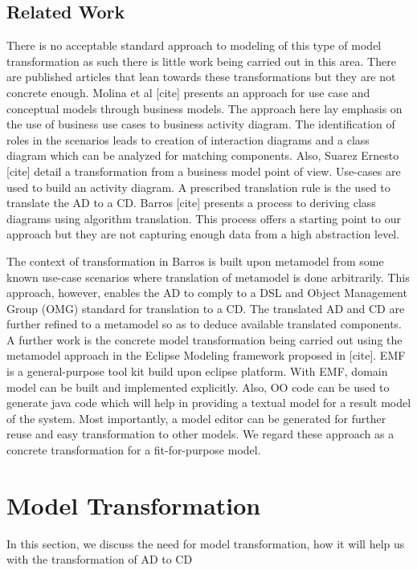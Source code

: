 \documentclass[10pt]{article}
\begin{document}
	\subsection{Related Work}
There is no acceptable standard approach to modeling of this type of model transformation as such there is little work being carried out in this area. There are published articles that lean towards these transformations but they are not concrete enough. Molina et al [cite] presents an approach for use case and conceptual models through business models. The approach here lay emphasis on the use of business use cases to business activity diagram. The identification of roles in the scenarios leads to creation of interaction diagrams and a class diagram which can be analyzed for matching components. Also, Suarez Ernesto [cite] detail a transformation from a business model point of view. Use-cases are used to build an activity diagram. A prescribed translation rule is the used to translate the AD to a CD. Barros [cite] presents a process to deriving class diagrams using algorithm translation. This process offers a starting point to our approach but they are not capturing enough data from a high abstraction level.

The context of transformation in Barros is built upon metamodel from some known use-case scenarios where translation of metamodel is done arbitrarily. This approach, however, enables the AD to comply to a DSL and Object Management Group (OMG) standard for translation to a CD. The translated AD and CD are further refined to a metamodel so as to deduce available translated components. A further work is the concrete model transformation being carried out using the metamodel approach in the Eclipse Modeling framework proposed in [cite]. EMF is a general-purpose tool kit build upon eclipse platform.  With EMF, domain model can be built and implemented explicitly. Also, OO code can be used to generate java code which will help in providing a textual model for a result model of the system. Most importantly, a model editor can be generated for further reuse and easy transformation to other models. We regard these approach as a concrete transformation for a fit-for-purpose model.
	
\section{Model Transformation}
	
In this section, we discuss the need for model transformation, how it will help us with the transformation of AD to CD
\end{document}
